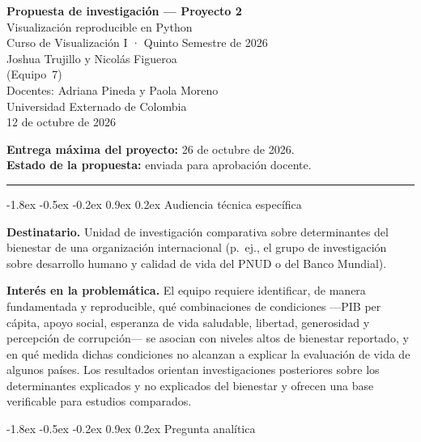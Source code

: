 \documentclass[11pt,a4paper]{article}
\makeatletter
\renewcommand\section{\@startsection{section}{1}{\z@}%
  {-1.8ex \@plus -0.5ex \@minus -0.2ex}%
  {0.9ex \@plus0.2ex}%
  {\normalfont\large\bfseries}}
\makeatother
\begin{document}
\begin{center}
{\LARGE\bfseries Propuesta de investigación --- Proyecto 2}\\[1.2em]
{\large Visualización reproducible en Python}\\[0.6em]
{\large Curso de Visualización I · Quinto Semestre de 2026}\\[1.6em]
{\large Joshua Trujillo y Nicolás Figueroa}\\[0.3em]
{\large (Equipo~7)}\\[1.6em]
{\normalsize Docentes: Adriana Pineda y Paola Moreno}\\[0.3em]
{\normalsize Universidad Externado de Colombia}\\[0.3em]
{\normalsize 12 de octubre de 2026}
\end{center}

\vspace{1.5em}
\noindent\textbf{Entrega máxima del proyecto:} 26 de octubre de 2026.\\
\textbf{Estado de la propuesta:} enviada para aprobación docente.
\vspace{0.8em}

\hrule
\vspace{1em}

\section{Audiencia técnica específica}

\textbf{Destinatario.} Unidad de investigación comparativa sobre determinantes del
bienestar de una organización internacional (p.\ ej., el grupo de investigación
sobre desarrollo humano y calidad de vida del PNUD o del Banco Mundial).

\textbf{Interés en la problemática.} El equipo requiere identificar, de manera
fundamentada y reproducible, qué combinaciones de condiciones ---PIB per cápita,
apoyo social, esperanza de vida saludable, libertad, generosidad y percepción de
corrupción--- se asocian con niveles altos de bienestar reportado, y en qué medida
dichas condiciones no alcanzan a explicar la evaluación de vida de algunos países.
Los resultados orientan investigaciones posteriores sobre los determinantes
explicados y no explicados del bienestar y ofrecen una base verificable para
estudios comparados.

\section{Pregunta analítica}
\end{document}
